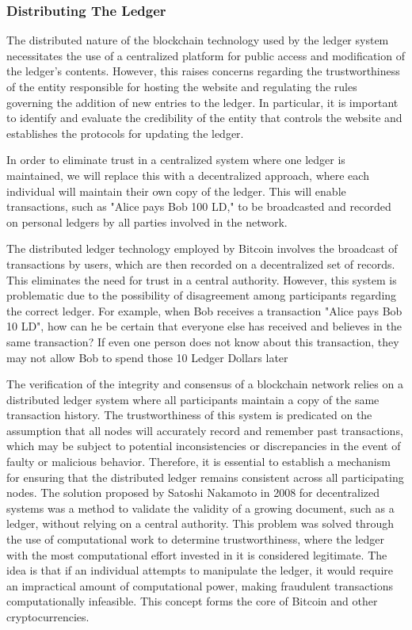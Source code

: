 \subsubsection{Distributing The Ledger}
The distributed nature of the blockchain technology used by the ledger system necessitates the use of a centralized platform for public access
and modification of the ledger's contents. However, this raises concerns regarding the trustworthiness of the entity responsible for hosting
the website and regulating the rules governing the addition of new entries to the ledger. In particular, it is important to identify and
evaluate the credibility of the entity that controls the website and establishes the protocols for updating the ledger.

In order to eliminate trust in a centralized system where one ledger is maintained, we will replace this with a decentralized approach, where
each individual will maintain their own copy of the ledger. This will enable transactions, such as "Alice pays Bob 100 LD," to be broadcasted
and recorded on personal ledgers by all parties involved in the network.

The distributed ledger technology employed by Bitcoin involves the broadcast of transactions by users, which are then recorded on a
decentralized set of records. This eliminates the need for trust in a central authority. However, this system is problematic due to the
possibility of disagreement among participants regarding the correct ledger. For example, when Bob receives a transaction "Alice pays Bob
10 LD", how can he be certain that everyone else has received and believes in the same transaction? If even one person does not know about
this transaction, they may not allow Bob to spend those 10 Ledger Dollars later

%

The verification of the integrity and consensus of a blockchain network relies on a distributed ledger system where all participants maintain
a copy of the same transaction history. The trustworthiness of this system is predicated on the assumption that all nodes will accurately
record and remember past transactions, which may be subject to potential inconsistencies or discrepancies in the event of faulty or malicious
behavior. Therefore, it is essential to establish a mechanism for ensuring that the distributed ledger remains consistent across all
participating nodes. The solution proposed by Satoshi Nakamoto in 2008 for decentralized systems was a method to validate the validity of
a growing document, such as a ledger, without relying on a central authority. This problem was solved through the use of computational
work to determine trustworthiness, where the ledger with the most computational effort invested in it is considered legitimate. The idea
is that if an individual attempts to manipulate the ledger, it would require an impractical amount of computational power, making fraudulent
transactions computationally infeasible. This concept forms the core of Bitcoin and other cryptocurrencies.
